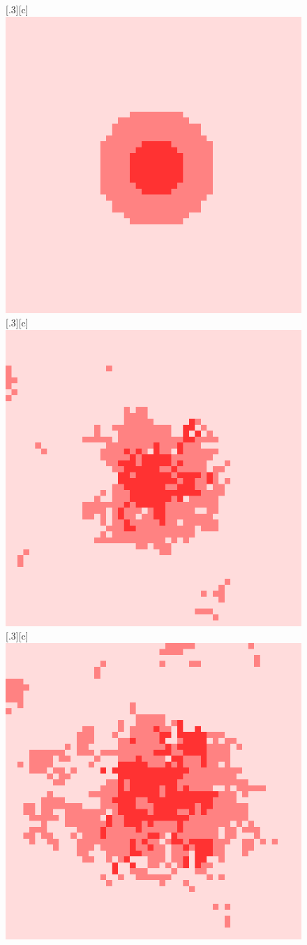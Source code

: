 \documentclass[12pt]{article}
\begin{document}
\begin{figure}[H]
  \centering
  [.3\linewidth][c]{
    \includegraphics[width=.3\linewidth]{images/sca_0.png}
  }
  [.3\linewidth][c]{
    \includegraphics[width=.3\linewidth]{images/sca_500.png}
  }
  [.3\linewidth][c]{
    \includegraphics[width=.3\linewidth]{images/sca_1000.png}
  }


\end{figure}
\end{document}
